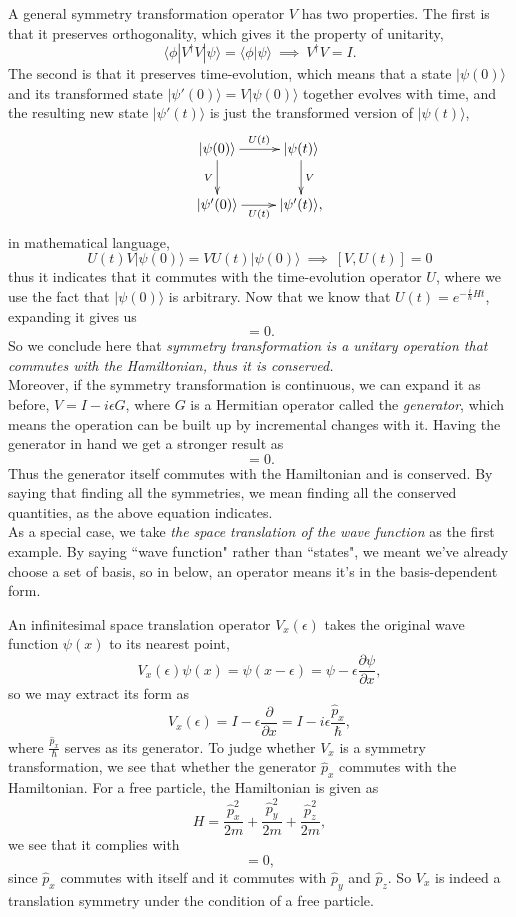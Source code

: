 \documentclass{article}
\newcommand{\be}{\begin{equation}}
\newcommand{\ee}{\end{equation}}
\newcommand{\p}{\partial}
\renewcommand{\1}{\left}
\renewcommand{\2}{\right}
\newcommand{\la}{\langle}
\newcommand{\ra}{\rangle}
\newcommand{\ep}{\epsilon}
\begin{document}
A general symmetry transformation operator $V$ has two properties. The first is that it preserves orthogonality, which gives it the property of unitarity,
\be
\la \phi|V^\dagger V|\psi\ra=\la \phi|\psi\ra \ \implies\ V^\dagger V=I.
\ee
The second is that it preserves time-evolution, which means that a state $|\psi(0)\ra$ and its transformed state $|\psi'(0)\ra=V|\psi(0)\ra$ together evolves with time, and the resulting new state $|\psi'(t)\ra$ is just the transformed version of $|\psi(t)\ra$,
\be
\begin{gathered} \xymatrix{
|\psi(0)\ra \ar[r]^{U(t)} \ar[d]_{V} &|\psi(t)\ra \ar[d]^{V} \\
|\psi'(0)\ra \ar[r]_{U(t)} & |\psi'(t)\ra, \\
} \end{gathered}
\ee
in mathematical language,
\be
U(t)V|\psi(0)\ra = VU(t)|\psi(0)\ra \ \implies\  [V,U(t)]=0
\ee
thus it indicates that it commutes with the time-evolution operator $U$, where we use the fact that $|\psi(0)\ra$ is arbitrary. Now that we know that $U(t)=e^{-\frac i \hbar H t}$, expanding it gives us
\be
[V,H]=0.
\ee
So we conclude here that \textit{symmetry transformation is a unitary operation that commutes with the Hamiltonian, thus it is conserved.}\\
Moreover, if the symmetry transformation is continuous, we can expand it as before, $V=I-i\ep G$, where $G$ is a Hermitian operator called the \textit{generator}, which means the operation can be built up by incremental changes with it. Having the generator in hand we get a stronger result as
\be
[G,H]=0.
\ee
Thus the generator itself commutes with the Hamiltonian and is conserved. By saying that finding all the symmetries, we mean finding all the conserved quantities, as the above equation indicates.\\

As a special case, we take \textit{the space translation of the wave function} as the first example. By saying ``wave function" rather than ``states", we meant we've already choose a set of basis, so in below, an operator means it's in the basis-dependent form.

An infinitesimal space translation operator $V_x(\ep)$ takes the original wave function $\psi(x)$ to its nearest point,
\be
V_x(\ep)\psi(x)=\psi(x-\ep)=\psi-\ep\frac{\p\psi}{\p x},
\ee
so we may extract its form as
\be
V_x(\ep)=I-\ep\frac{\p}{\p x}=I-i\ep\frac{\hat p_x}{\hbar},
\ee
where $\frac{\hat p_x}{\hbar}$ serves as its generator. To judge whether $V_x$ is a symmetry transformation, we see that whether the generator $\hat p_x$ commutes with the Hamiltonian. For a free particle, the Hamiltonian is given as
\be
H=\frac{\hat p_x^2}{2m}+\frac{\hat p_y^2}{2m}+\frac{\hat p_z^2}{2m},
\ee
we see that it complies with 
\be
[\hat p_x,H]=0,
\ee
since $\hat p_x$ commutes with itself and it commutes with $\hat p_y$ and $\hat p_z$. So $V_x$ is indeed a translation symmetry under the condition of a free particle.\\
\end{document}
